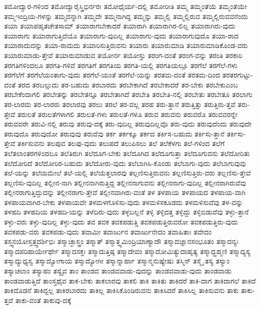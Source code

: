 {ತಮೋದ್ವಾರ-ಗಳಿಂದ
ತಮೋದ್ವಾರೈಸ್ತ್ರಿಭಿರ್ನರಃ
ತಮೋಧೈರ್ಯ-ದಲ್ಲಿ
ತಮೋರೀತಿ
ತಮ್ಮ
ತಮ್ಮಂತೆಯೆ
ತಮ್ಮಂತೆಯೇ
ತಮ್ಮಇಂದ್ರಿಯ-ಗಳನ್ನು
ತಮ್ಮದನ್ನಾಗಿ
ತಮ್ಮದೇ
ತಮ್ಮನಾಗಿದ್ದ
ತಮ್ಮನ್ನು
ತಮ್ಮಲ್ಲಿ
ತಮ್ಮಲ್ಲಿರುವ
ತಮ್ಮಲ್ಲಿರುವವನೆಂದು
ತಯಾ
ತಯಾಪಹೃತಚೇತಸಾಮ್
ತಯಾರಾಗಬೇಕಾದರೆ
ತಯಾರಾಗಿ
ತಯಾರಾಗಿರ-ಲಿಲ್ಲ
ತಯಾರಾಗಿರು-ವುದು
ತಯಾರಾಗು
ತಯಾರಾಗುತ್ತಿದೆಯೊ
ತಯಾರಾಗು-ವುದಿಲ್ಲ
ತಯಾರಾಗು-ವುದು
ತಯಾರಾಗುವುದೊ
ತಯಾ-ರಾದ
ತಯಾರಾದುದನ್ನು
ತಯಾ-ರಾದುದು
ತಯಾರಿಸುತ್ತಿರುವನು
ತಯಾರು
ತಯಾರುಮಾಡಿ
ತಯಾರುಮಾಡಿಕೊಂಡ-ವರು
ತಯಾರುಮಾಡು-ತ್ತೇವೆ
ತಯಾರುಮಾಡುವ
ತಯೋರ್ನ
ತಯೋಸ್ತು
ತರಂಗ-ದಂತೆ
ತರಂಗ-ವನ್ನು
ತರಂತಿ
ತರಕಾರಿ
ತರಗತಿಗಳಿಂದಲೂ
ತರಗತಿ-ಗಳಿವೆ
ತರಗತಿಗೆ
ತರಗತಿಯ
ತರಗತಿ-ಯಲ್ಲಿ
ತರಗತಿಯಲ್ಲೂ
ತರಗೆಲೆ
ತರಗೆಲೆ-ಗಳು
ತರಗೆಲೆಗೆ
ತರಗೆಲೆಯಂತಾಗು-ವುದು
ತರಗೆಲೆ-ಯಂತೆ
ತರಗೆಲೆ-ಯನ್ನು
ತರತಮ-ದಂತೆ
ತರತಮ-ದಿಂದ
ತರತರಗುಟ್ಟು-ವಂತೆ
ತರದ
ತರಬಲ್ಲುದು
ತರ-ಬಹುದು
ತರಬಾರದು
ತರಬೇಕಾಗಿದೆ
ತರಬೇಕಾದರೆ
ತರ-ಬೇಕು
ತರಬೇಕುಎಂಬ
ತರಬೇಕೆಂದಾಗಲಿ
ತರಬೇತನ್ನು
ತರಬೇತನ್ನೂ
ತರಬೇತಾಗಿದೆ
ತರಬೇತಿ
ತರಬೇತಿ-ನಲ್ಲಿ
ತರಬೇತು
ತರಬೇತೂ
ತರಲಾಗು
ತರ-ಲಾರದು
ತರ-ಲಾರರು
ತರಲಾರವು
ತರಲು
ತರಲೆ
ತರ-ವಲ್ಲ
ತರಹ
ತರು-ತ್ತಾನೆ
ತರುತ್ತಿತ್ತು
ತರುತ್ತಿರು-ತ್ತವೆ
ತರು-ತ್ತೇವೆ
ತರುಲತೆ
ತರುಲತೆಗಳಾಗಲಿ
ತರುಲತೆ-ಗಳು
ತರುಲತೆ-ಗಳೂ
ತರುವ
ತರುವನು
ತರುವರೊ
ತರುವವರನ್ನೇ
ತರುವವರೇ
ತರುವಿ-ನಲ್ಲಿ
ತರುವು
ತರುವು-ದಕ್ಕೆ
ತರು-ವುದಿಲ್ಲ
ತರುವುದಿಲ್ಲವೊ
ತರು-ವುದು
ತರುವುದೆಂದು
ತರುವುದೇ
ತರುವುದೊ
ತರುವುದೋ
ತರುವುವು
ತರುವೆವು
ತರ್ಕ
ತರ್ಕಕ್ಕೂ
ತರ್ಕದ
ತರ್ಕಿಸ-ಬಹುದು
ತರ್ಕಿಸು-ತ್ತಾನೆ
ತರ್ಕಿಸು-ತ್ತೇವೆ
ತರ್ಕಿಸುವನು
ತಲಪುವ
ತಲಪು-ವುದು
ತಲುಪದೆ
ತಲುಪಿಸಲು
ತಲೆ
ತಲೆಕೆಳಗು
ತಲೆ-ಗಳಿಂದ
ತಲೆಗೆ
ತಲೆತಲಾಂತರಗಳಿಂದಲೂ
ತಲೆತಿರುಗಿ
ತಲೆದೂಗ-ಬೇಕು
ತಲೆದೂಗಿದ
ತಲೆದೂಗುತ್ತಾ
ತಲೆದೂಗುವನು
ತಲೆದೋರಿತು
ತಲೆದೋರಿದೆ
ತಲೆದೋರಿರ-ಬಹುದು
ತಲೆದೋರು-ವುದು
ತಲೆಬಾಗಿಸಿ-ಕೊಂಡು
ತಲೆಬಾಗು-ವುದು
ತಲೆಬಾಗುವುವು
ತಲೆ-ಯನ್ನು
ತಲೆಯಮೇಲೆ
ತಲೆ-ಯಲ್ಲಿ
ತಲೆಯೆತ್ತಲಾರವು
ತಲ್ಲಣಿಸುತ್ತಿರುವನು
ತಲ್ಲಣಿಸುತ್ತಿರು-ವರು
ತಲ್ಲಣಿಸು-ತ್ತೇವೆ
ತಲ್ಲಣಿಸು-ವುದಿಲ್ಲ
ತಲ್ಲೀನ-ನಾಗಿ
ತಲ್ಲೀನನಾಗಿರುತ್ತಿದ್ದ
ತಲ್ಲೀನನಾಗುವನು
ತಲ್ಲೀನನಾಗು-ವುದಿಲ್ಲ
ತಲ್ಲೀನರಾಗಿರುವೆವು
ತಲ್ಲೀನರಾಗುತ್ತಿದ್ದುದನ್ನು
ತಲ್ಲೀನರಾಗು-ತ್ತೇವೆ
ತಲ್ಲೀನವಾಗಿರು-ವಂತೆ
ತಳ
ತಳಪಾಯ
ತಳಪಾಯದ
ತಳಪಾಯ-ವಾಗಿ
ತಳಪಾಯವಾಗಿರ-ಬೇಕು
ತಳಪಾಯವೇ
ತಳಮಳಗೊಳಿಸು-ವುದು
ತಳಮಳಿಸಕೂಡದು
ತಳಮಳಿಸುವೆವು
ತಳ-ವನ್ನು
ತಳಹದಿ
ತಳಹದಿಯ
ತಳಹದಿ-ಯನ್ನು
ತಳೆದಿರು-ವುದು
ತಳ್ಳಬಲ್ಲನೆ
ತಳ್ಳಿ
ತಳ್ಳಿದತ್ತ
ತಳ್ಳಿದ್ದು
ತಳ್ಳಿಬಿಡುವೆವು
ತಳ್ಳು-ತ್ತಾನೆ
ತಳ್ಳು-ವರು
ತಳ್ಳು-ವುದಿಲ್ಲ
ತಳ್ಳು-ವುದು
ತವ
ತವಕ
ತವಕಪಡುತ್ತಿ
ತವಕಪಡುತ್ತಿರುವರೋ
ತವಕಪಡುತ್ತಿರು-ವುದು
ತವಕಪಡು-ವರು
ತವಕಪಡು-ವುದು
ತವಾಮೀ
ತವಾರ್ಜುನ
ತವಾರ್ಜುನೇದಂ
ತವಾಹಿತಾಃ
ತವೇದಂ
ತಸ್ತ್ವನಯೋಸ್ತತ್ತ್ವದರ್ಶಿಭಿಃ
ತಸ್ಮಾಚ್ಛಾಸ್ತ್ರಂ
ತಸ್ಮಾತ್
ತಸ್ಮಾತ್ತ್ವಮಿಂದ್ರಿಯಾಣ್ಯಾದೌ
ತಸ್ಮಾದಜ್ಞಾನಸಂಭೂತಂ
ತಸ್ಮಾದನ್ಯಃ
ತಸ್ಮಾದಪರಿಹಾರ್ಯೇರ್ಥೇ
ತಸ್ಮಾದಸಕ್ತಃ
ತಸ್ಮಾದುತ್ತಿಷ್ಠ
ತಸ್ಮಾದೇವಂ
ತಸ್ಮಾದೋಮಿತ್ಯುದಾಹೃತ್ಯ
ತಸ್ಮಾದ್ಬ್ರಹ್ಮಣಿ
ತಸ್ಮಾದ್ಯಸ್ಯ
ತಸ್ಮಾದ್ಯುಧ್ಯಸ್ವ
ತಸ್ಮಾದ್ಯೋಗಾಯ
ತಸ್ಮಾದ್ಯೋಗೀ
ತಸ್ಮಾನ್ನಾರ್ಹಾ
ತಸ್ಮಾನ್ಮನುಷ್ಯೇಷು
ತಸ್ಮಿನ್
ತಸ್ಮೈ
ತಸ್ಯ
ತಸ್ಯಾಂ
ತಸ್ಯಾಚಲಾಂ
ತಸ್ಯಾಹಂ
ತಸ್ಯೈವ
ತಾಂ
ತಾಂಡವ
ತಾಂಡವವಾಡು-ವುದನ್ನು
ತಾಂಡವವಾಡು-ವುದು
ತಾಂಡವಾಡು
ತಾಂಡವಾಡುತ್ತಿದೆ
ತಾಂಸ್ತಥೈವ
ತಾಕ-ಬೇಕು
ತಾಕಲಾರವು
ತಾಕಲಿ
ತಾಕಿ
ತಾಕಿತು
ತಾಕಿದರೆ
ತಾಕಿ-ದಾಗ
ತಾಕಿದಾಗಲೆ
ತಾಕಿದೆ
ತಾಕಿದೊಡನೆ
ತಾಕಿದ್ದಲ್ಲ
ತಾಕಿರಬಾರದು
ತಾಕಿಲ್ಲ
ತಾಕಿಸಿಕೊಂಡಿರುವನು
ತಾಕಿಸಿದರೆ
ತಾಕಿಸಿಲ್ಲ
ತಾಕಿಸುವನು
ತಾಕು
ತಾಕು-ತ್ತವೆ
ತಾಕು-ವಂತೆ
ತಾಕುವು-ದಕ್ಕೆ
}
